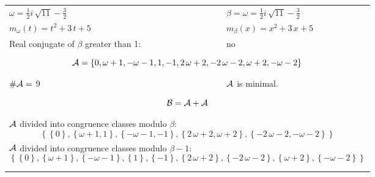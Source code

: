 \begin{exmp}
\label{ex:compareAO}


\rule{0cm}{0cm}

\begin{tabular}{ll}
$\omega=  \frac{1}{2} i \, \sqrt{11} - \frac{3}{2} $  & $\beta= \omega = \frac{1}{2} i \, \sqrt{11} - \frac{3}{2} $\\
$m_\omega(t)=  t^{2} + 3 \, t + 5 $  & $m_\beta(x)=  x^{2} + 3 \, x + 5 $\\
Real conjugate of $\beta$ greater than 1:   &  no \\ \hline
\multicolumn{2}{l}{\begin{minipage}{\textwidth}\begin{dmath*}\A = \left\{0, \omega + 1, -\omega - 1, 1, -1, 2 \, \omega + 2, -2 \, \omega - 2, \omega + 2, -\omega - 2\right\}  \end{dmath*}\end{minipage} }\\
$\#\mathcal{A}= $ 9 $ $ & $\mathcal{A}$ is minimal. \\
\multicolumn{2}{l}{\begin{minipage}{\textwidth}\begin{dmath*}\B =\A+\A \end{dmath*}\end{minipage} }\\[10pt]
\multicolumn{2}{l}{\begin{minipage}{\textwidth}$\mathcal{A}$ divided into congruence classes modulo $\beta$: \begin{dmath*} \left\{\left\{0\right\}, \left\{\omega + 1, 1\right\}, \left\{-\omega - 1, -1\right\}, \left\{2 \, \omega + 2, \omega + 2\right\}, \left\{-2 \, \omega - 2, -\omega - 2\right\}\right\}  \end{dmath*}\end{minipage} }\\[10pt]
\multicolumn{2}{l}{\begin{minipage}{\textwidth}$\mathcal{A}$ divided into congruence classes modulo $\beta-1$: \begin{dmath*} \left\{\left\{0\right\}, \left\{\omega + 1\right\}, \left\{-\omega - 1\right\}, \left\{1\right\}, \left\{-1\right\}, \left\{2 \, \omega + 2\right\}, \left\{-2 \, \omega - 2\right\}, \left\{\omega + 2\right\}, \left\{-\omega - 2\right\}\right\}  \end{dmath*}\end{minipage} }\\
 & \\ \hline
 & \\
\end{tabular}


\end{exmp}

